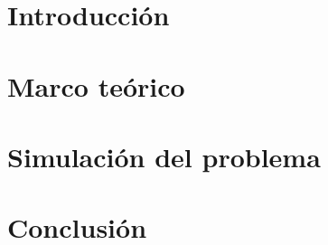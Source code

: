 \section{Introducción}
\cite{template}
\section{Marco teórico}
\section{Simulación del problema}
\section{Conclusión}

